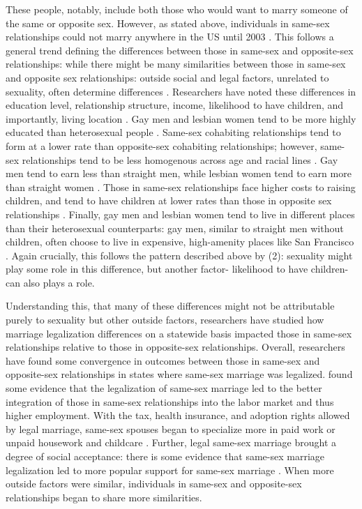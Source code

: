 \documentclass[12pt,letterpaper]{article}
\begin{document}
These people, notably, include both those who would want to marry someone of the same or opposite sex. However, as stated above, individuals in same-sex relationships could not marry anywhere in the US until 2003 \citep{1, 3, 5, 12}. This follows a general trend defining the differences between those in same-sex and opposite-sex relationships: while there might be many similarities between those in same-sex and opposite sex relationships: outside social and legal factors, unrelated to sexuality, often determine differences \citep{2}. Researchers have noted these differences in education level, relationship structure, income, likelihood to have children, and importantly, living location \citep{2, 11, 6, 7, 8, 10, 7}. Gay men and lesbian women tend to be more highly educated than heterosexual people \citep{2, 7, 11}. Same-sex cohabiting relationships tend to form at a lower rate than opposite-sex cohabiting relationships; however, same-sex relationships tend to be less homogenous across age and racial lines \citep{2, 7}. Gay men tend to earn less than straight men, while lesbian women tend to earn more than straight women \citep{6}. Those in same-sex relationships face higher costs to raising children, and tend to have children at lower rates than those in opposite sex relationships \citep{8, 10, 11}. Finally, gay men and lesbian women tend to live in different places than their heterosexual counterparts: gay men, similar to straight men without children, often choose to live in expensive, high-amenity places like San Francisco \citep{7, 10, 11, 13}. Again crucially, this follows the pattern described above by (2): sexuality might play some role in this difference, but another factor- likelihood to have children- can also plays a role.

Understanding this, that many of these differences might not be attributable purely to sexuality but other outside factors, researchers have studied how marriage legalization differences on a statewide basis impacted those in same-sex relationships relative to those in opposite-sex relationships. Overall, researchers have found some convergence in outcomes between those in same-sex and opposite-sex relationships in states where same-sex marriage was legalized. \citep{3} found some evidence that the legalization of same-sex marriage led to the better integration of those in same-sex relationships into the labor market and thus higher employment. With the tax, health insurance, and adoption rights allowed by legal marriage, same-sex spouses began to specialize more in paid work or unpaid housework and childcare \citep{3, 4, 6}. Further, legal same-sex marriage brought a degree of social acceptance: there is some evidence that same-sex marriage legalization led to more popular support for same-sex marriage \citep{3, 21}. When more outside factors were similar, individuals in same-sex and opposite-sex relationships began to share more similarities.
\end{document}
